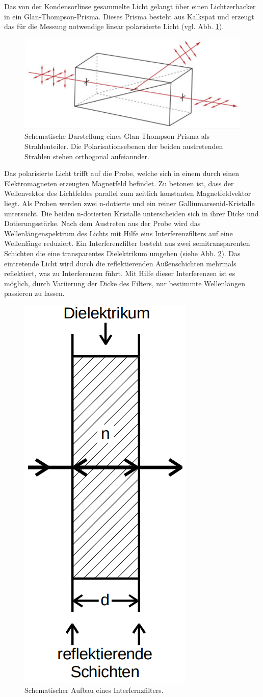 Das von der Kondensorlinse gesammelte Licht gelangt über einen Lichtzerhacker in
ein Glan-Thompson-Prisma.
Dieses Prisma besteht aus Kalkspat und erzeugt das für die Messung notwendige linear polarisierte Licht (vgl. Abb. \ref{fig:glan_thompson_prisma}).
\begin{figure}
\centering
\includegraphics[width=0.5\linewidth]{./content/images/glan_thompson_prisma.png}
\caption{Schematische Darstellung eines Glan-Thompson-Prisma als Strahlenteiler.
Die Polarisationsebenen der beiden austretenden Strahlen stehen orthogonal aufeiannder.}
\label{fig:glan_thompson_prisma}
\end{figure}
Das polarisierte Licht trifft auf die Probe, welche sich in einem durch einen Elektromagneten erzeugten Magnetfeld befindet.
Zu betonen ist, dass der Wellenvektor des Lichtfeldes parallel zum zeitlich konstanten Magnetfeldvektor liegt.
Als Proben werden zwei n-dotierte und ein reiner Galliumarsenid-Kristalle untersucht.
Die beiden n-dotierten Kristalle unterscheiden sich in ihrer Dicke und Dotierungsstärke.
Nach dem Austreten aus der Probe wird das Wellenlängenspektrum des Lichts mit Hilfe
eins Interferenzfilters auf eine Wellenlänge reduziert.
Ein Interferenzfilter besteht aus zwei semitransparenten Schichten die eine transparentes Dielektrikum umgeben (siehe Abb. \ref{fig:interferenzfilter}).
Das eintretende Licht wird durch die reflektierenden
Außenschichten mehrmals reflektiert, was zu Interferenzen führt.
Mit Hilfe dieser Interferenzen ist es möglich, durch Variierung der
Dicke des Filters, nur bestimmte Wellenlängen passieren zu lassen.
\begin{figure}
\centering
\includegraphics[width=0.15\linewidth]{./content/images/interferenzfilter.png}
\caption{Schematischer Aufbau eines Interfernzfilters.}
\label{fig:interferenzfilter}
\end{figure}
